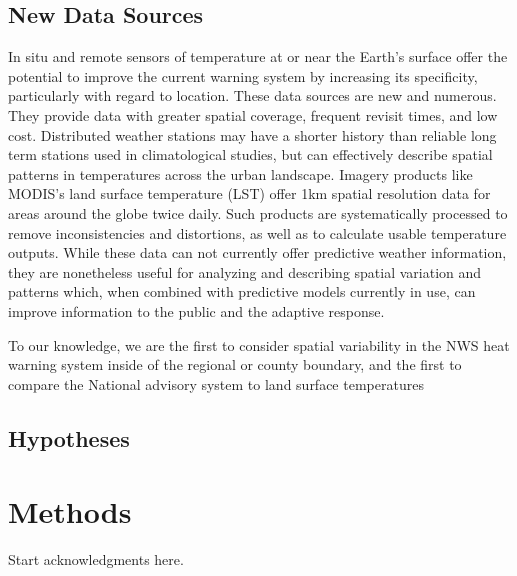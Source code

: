 \documentclass[twocol]{ametsoc}
\begin{document}
\subsection{New Data Sources} \label{subsection:newDataSources}
In situ and remote sensors of temperature at or near the Earth's surface offer the potential to improve the current warning system by increasing its specificity, particularly with regard to location. These data sources are new and numerous. They provide data with greater spatial coverage, frequent revisit times, and low cost. Distributed weather stations may have a shorter history than reliable long term stations used in climatological studies, but can effectively describe spatial patterns in temperatures across the urban landscape. Imagery products like MODIS's land surface temperature (LST) offer 1km spatial resolution data for areas around the globe twice daily. Such products are systematically processed to remove inconsistencies and distortions, as well as to calculate usable temperature outputs. While these data can not currently offer predictive weather information, they are nonetheless useful for analyzing and describing spatial variation and patterns which, when combined with predictive models currently in use, can improve information to the public and the adaptive response.

To our knowledge, we are the first to consider spatial variability in the NWS heat warning system inside of the regional or county boundary, and the first to compare the National advisory system to land surface temperatures

\subsection{Hypotheses} \label{subsection:hypotheses}



\section{Methods}\label{section:methods}



%
\acknowledgments
Start acknowledgments here.

%
\end{document}
